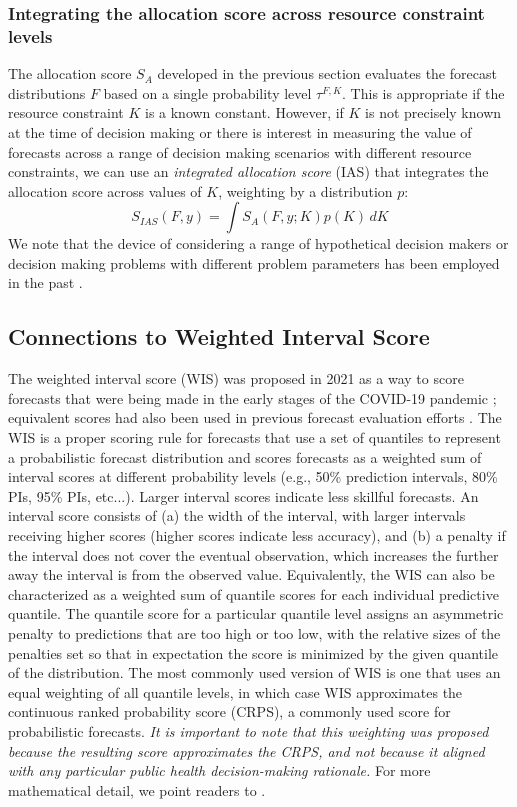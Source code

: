 \documentclass{article}\usepackage[]{graphicx}\usepackage[]{xcolor}
\begin{document}
\subsubsection{Integrating the allocation score across resource constraint levels}{}
\label{sec:methods.detailed.integrated_allocation}

The allocation score $S_A$ developed in the previous section evaluates the forecast distributions
$F$ based on a single probability level $\tau^{F,K}$. This is appropriate if the resource constraint $K$ is a known
constant. However, if $K$ is not precisely known at the time of decision making or there is interest in measuring the
value of forecasts across a range of decision making scenarios with different resource constraints, we can use an
\emph{integrated allocation score} (IAS) that integrates the allocation score across values of $K$, weighting by a
distribution $p$:
$$S_{IAS}(F, y) = \int S_A(F,y; K) p(K) \, dK$$
We note that the device of considering a range of hypothetical decision makers or decision making problems with
different problem parameters has been employed in the past \cite[e.g.,][]{murphy1993whatisagoodforecast}.

\subsection{Connections to Weighted Interval Score}
\label{sec:methods.related}

The weighted interval score (WIS) was proposed in 2021 as a way to score forecasts that were being made in the early
stages of the COVID-19 pandemic \citep{bracher2021evaluating}; equivalent scores had also been used in previous forecast
evaluation efforts \cite[e.g.,][]{hong2016probabilisticEnergyForecasting}. The WIS is a proper scoring rule for
forecasts that use a set of quantiles to represent a probabilistic forecast distribution and scores forecasts as a weighted sum of interval scores at different probability levels (e.g., 50\% prediction intervals, 80\% PIs, 95\% PIs, etc...). Larger interval scores indicate less skillful forecasts. An interval score consists of (a) the width of the interval, with
larger intervals receiving higher scores (higher scores indicate less accuracy), and (b) a penalty if the interval does
not cover the eventual observation, which increases the further away the interval is from the observed value.
Equivalently, the WIS can also be characterized as a weighted sum of quantile scores for each individual predictive
quantile. The quantile score for a particular quantile level assigns an asymmetric penalty to predictions that are too
high or too low, with the relative sizes of the penalties set so that in expectation the score is minimized by the given
quantile of the distribution. The most commonly used version of WIS is one that uses an equal weighting of all quantile
levels, in which case WIS approximates the continuous ranked probability score (CRPS), a commonly used score for
probabilistic forecasts. \emph{It is important to note that this weighting was proposed because the resulting score
approximates the CRPS, and not because it aligned with any particular public health decision-making rationale.} For more mathematical detail, we point readers to \cite{bracher2021evaluating}.
\end{document}
